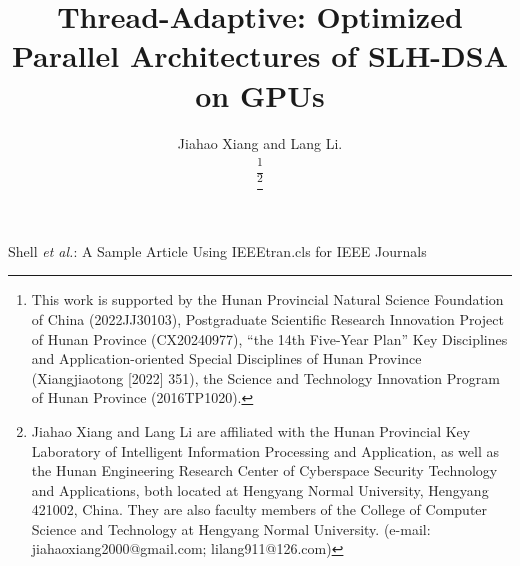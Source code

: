 \documentclass[journal]{IEEEtran}
\begin{document}
\title{Thread-Adaptive: Optimized Parallel Architectures of SLH-DSA on GPUs}

\author{Jiahao Xiang and Lang Li.

  \thanks{This work is supported by the Hunan Provincial Natural Science Foundation of China (2022JJ30103), Postgraduate Scientific Research Innovation Project of Hunan Province (CX20240977), “the 14th Five-Year Plan” Key Disciplines and Application-oriented Special Disciplines of Hunan Province (Xiangjiaotong [2022] 351), the Science and Technology Innovation Program of Hunan Province (2016TP1020).}

  \thanks{Jiahao Xiang and Lang Li are affiliated with the Hunan Provincial Key Laboratory of Intelligent Information Processing and Application, as well as the Hunan Engineering Research Center of Cyberspace Security Technology and Applications, both located at Hengyang Normal University, Hengyang 421002, China. They are also faculty members of the College of Computer Science and Technology at Hengyang Normal University. (e-mail: jiahaoxiang2000@gmail.com; lilang911@126.com)}%
}

%
{Shell \MakeLowercase{\textit{et al.}}: A Sample Article Using IEEEtran.cls for IEEE Journals}

\IEEEpubid{}

\maketitle
\end{document}
